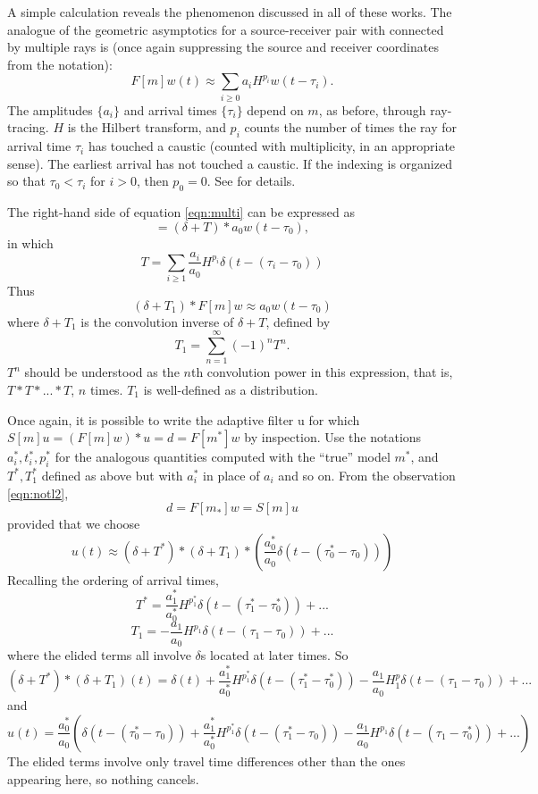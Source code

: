 A simple calculation reveals the phenomenon discussed in all of these
works. The analogue of the geometric asymptotics for a source-receiver
pair with connected by multiple rays is (once again suppressing the
source and receiver coordinates from the notation):
\begin{equation}
  \label{eqn:multi}
  F[m]w(t) \approx \sum_{i \ge 0} a_i H^{p_i}w(t-\tau_i).
\end{equation}
The amplitudes $\{a_i\}$ and arrival times $\{\tau_i\}$ depend on $m$, as
before, through ray-tracing. $H$ is the Hilbert transform, and $p_i$
counts the number of times the ray for arrival time $\tau_i$ has
touched a caustic (counted with multiplicity, in an appropriate
sense). The earliest arrival has not touched a caustic. If the
indexing is organized so that $\tau_0 < \tau_i$ for $i>0$, then
$p_0=0$. See \cite{Friedlander:75} for details.

The right-hand side of equation \ref{eqn:multi} can be expressed as
\[
  = (\delta + T) * a_0w(t-\tau_0),
\]
in which 
\[
  T = \sum_{i \ge 1}
  \frac{a_i}{a_0}H^{p_i}\delta(t-(\tau_i-\tau_0))
\]
Thus
\begin{equation}
  \label{eqn:unwrap}
  (\delta +T_1) * F[m]w \approx  a_0w(t-\tau_0)
\end{equation}
where $\delta + T_1$ is the convolution inverse of $\delta + T$,
defined by 
\[
  T_1 = \sum_{n=1}^{\infty} (-1)^n T^n.
\]
$T^n$ should be understood as the $n$th convolution power in this
expression, that is, $T*T*...*T$, $n$ times. $T_1$ is well-defined as a distribution.

Once again, it is possible to write the adaptive filter u for which $S[m]u = (F[m]w)*u = d =
F[m^*]w$ by inspection. Use the notations $a^*_i, t^*_i, p^*_i$ for
the analogous quantities computed with the ``true'' model $m^*$, and
$T^*, T_1^*$ defined as above but with $a^*_i$ in place of $a_i$ and so
on. From the observation \ref{eqn:notl2},
\[
  d = F[m_*]w = S[m]u
\]
provided that we choose
\begin{equation}
  \label{eqn:notl2again}
u(t) \approx (\delta + T^*)*(\delta +
T_1)*\left(\frac{a^*_0}{a_0}\delta(t - (\tau^*_0-\tau_0))\right)
\end{equation}
Recalling the ordering of arrival times, 
\[
  T^* = \frac{a^*_1}{a^*_0}H^{p_1^*} \delta(t-(\tau^*_1-\tau^*_0)) + ...
\]
\[
  T_1 = -\frac{a_1}{a_0}H^{p_1} \delta(t-(\tau_1-\tau_0)) + ...
\]
where the elided terms all involve $\delta$s located at later times.
So
\[
  (\delta + T^*)*(\delta + T_1)(t) = \delta(t)  +  \frac{a^*_1}{a^*_0}
  H^{p_1^*}\delta(t-(\tau^*_1-\tau^*_0)) -\frac{a_1}{a_0}H^p_1
  \delta(t-(\tau_1-\tau_0)) + ...
\]
and
\begin{equation}
  \label{eqn:notl2explicit}
  u(t) = \frac{a^*_0}{a_0}\left(\delta(t - (\tau^*_0-\tau_0)) +
    \frac{a^*_1}{a^*_0}H^{p_1^*}\delta(t-(\tau^*_1-\tau_0)) -
    \frac{a_1}{a_0}H^{p_1}\delta(t-(\tau_1-\tau_0^*)) + ...\right)
\end{equation}
The elided terms involve only travel time differences other than the
ones appearing here, so nothing cancels.

